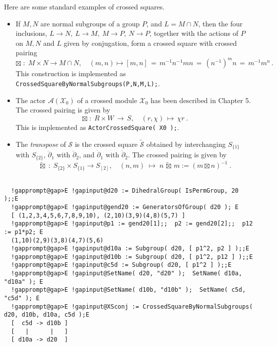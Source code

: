 \documentclass[a4paper,11pt]{report}
\begin{document}
{{{ Here are some standard examples of crossed squares. 
\begin{itemize}
\item  If $M, N$ are normal subgroups of a group $P$, and $L = M \cap N$, then the four inclusions, $L \to N,~ L \to M,~ M \to P,~ N \to P$, together with the actions of $P$ on $M, N$ and $L$ given by conjugation, form a crossed square with crossed pairing 
\[ \boxtimes \;:\; M \times N \to M\cap N, \quad (m,n) \mapsto [m,n] \,=\,
m^{-1}n^{-1}mn \,=\,(n^{-1})^mn \,=\, m^{-1}m^n\,. \]
 This construction is implemented as \texttt{CrossedSquareByNormalSubgroups(P,N,M,L);}. 
\item  The actor $\mathcal{A}(\mathcal{X}_0)$ of a crossed module $\mathcal{X}_0$ has been described in Chapter 5. The crossed pairing is given by 
\[ \boxtimes \;:\; R \times W \,\to\, S, \quad (r,\chi) \,\mapsto\, \chi r~. \]
 This is implemented as \texttt{ActorCrossedSquare( X0 );}. 
\item  The \emph{transpose} of $\mathcal{S}$ is the crossed square $\tilde{\mathcal{S}}$ obtained by interchanging $S_{\{1\}}$ with $S_{\{2\}}$, $\ddot{\partial}_1$ with $\ddot{\partial}_2$, and $\dot{\partial}_1$ with $\dot{\partial}_2$. The crossed pairing is given by 
\[ \tilde{\boxtimes} \;:\; S_{\{2\}} \times S_{\{1\}} \to S_{[2]}, \quad (n,m)
\;\mapsto\; n\,\tilde{\boxtimes}\,m := (m \boxtimes n)^{-1}~. \]
 
\end{itemize}
 }

 

 
\begin{Verbatim}[commandchars=!@E,fontsize=\small,frame=single,label=Example]
  
  !gapprompt@gap>E !gapinput@d20 := DihedralGroup( IsPermGroup, 20 );;E
  !gapprompt@gap>E !gapinput@gend20 := GeneratorsOfGroup( d20 ); E
  [ (1,2,3,4,5,6,7,8,9,10), (2,10)(3,9)(4,8)(5,7) ]
  !gapprompt@gap>E !gapinput@p1 := gend20[1];;  p2 := gend20[2];;  p12 := p1*p2; E
  (1,10)(2,9)(3,8)(4,7)(5,6)
  !gapprompt@gap>E !gapinput@d10a := Subgroup( d20, [ p1^2, p2 ] );;E
  !gapprompt@gap>E !gapinput@d10b := Subgroup( d20, [ p1^2, p12 ] );;E
  !gapprompt@gap>E !gapinput@c5d := Subgroup( d20, [ p1^2 ] );;E
  !gapprompt@gap>E !gapinput@SetName( d20, "d20" );  SetName( d10a, "d10a" ); E
  !gapprompt@gap>E !gapinput@SetName( d10b, "d10b" );  SetName( c5d, "c5d" ); E
  !gapprompt@gap>E !gapinput@XSconj := CrossedSquareByNormalSubgroups( d20, d10b, d10a, c5d );E
  [  c5d -> d10b ]
  [   |      |   ]
  [ d10a -> d20  ]
  

\end{Verbatim}}}
\end{document}
